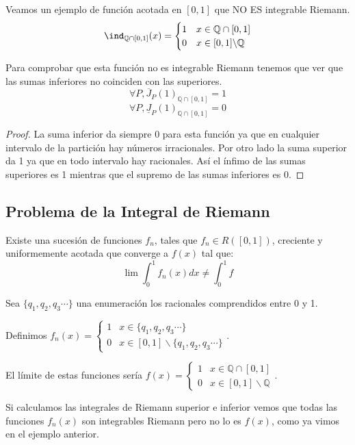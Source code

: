 \documentclass{apuntes}
\begin{document}
\begin{example}
Veamos un ejemplo de función acotada en $[ 0,1]$ que NO ES integrable Riemann.
\[
 \ind_{\mathbb{Q}  \cap  [0,1]} (x) =
  \begin{cases}
   1 &  x \in \mathbb{Q} \cap [0,1] \\
   0       &  x \in [0,1] \backslash \mathbb{Q}
  \end{cases}
\]

Para comprobar que esta función no es integrable Riemann tenemos que ver que las sumas inferiores no coinciden con las superiores.
\[\forall P, \overline{J}_P(1)_{\mathbb{Q} \cap [0,1]} = 1\]
\[\forall P, \underline{J}_P(1)_{\mathbb{Q} \cap [0,1]} = 0\]


\begin{proof}
La suma inferior da siempre 0 para esta función ya que en cualquier intervalo de la partición hay números irracionales. Por otro lado la suma superior da 1 ya que en todo intervalo hay racionales. Así el ínfimo de las sumas superiores es 1 mientras que el supremo de las sumas inferiores es 0.
\end{proof}
\end{example}

\subsection{Problema de la Integral de Riemann}
Existe una sucesión de funciones $f_n$, tales que $f_n\in R([ 0, 1 ])$, creciente y uniformemente acotada que converge a $f(x)$ tal que:
\[\lim \int_0^1 f_n(x) dx \neq \int_0^1 f\]

\begin{example}
Sea $\lbrace q_1, q_2, q_3 \cdots \rbrace$ una enumeración los racionales comprendidos entre 0 y 1.

Definimos $f_n(x)=\begin{cases}
   1 &  x \in \lbrace q_1, q_2, q_3 \cdots \rbrace \\
   0       &  x \in [0,1] \backslash \lbrace q_1, q_2, q_3 \cdots \rbrace
  \end{cases}$.
  
El límite de estas funciones sería $f(x)=\begin{cases}
   1 &  x \in \mathbb{Q} \cap [0,1] \\
   0       &  x \in [0,1] \backslash \mathbb{Q}
  \end{cases}$.

Si calculamos las integrales de Riemann superior e inferior vemos que todas las funciones $f_n(x)$ son integrables Riemann pero no lo es $f(x)$, como ya vimos en el ejemplo anterior. %
\end{example}
\end{document}
